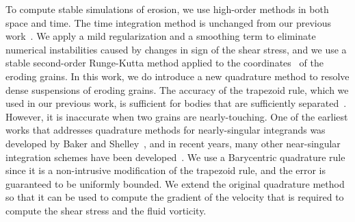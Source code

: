 \documentclass[preprint,10pt]{elsarticle}
\begin{document}
To compute stable simulations of erosion, we use high-order methods in
both space and time. The time integration method is unchanged from our
previous work~\cite{qua-moo2018}.  We apply a mild regularization and a
smoothing term to eliminate numerical instabilities caused by changes in
sign of the shear stress, and we use a stable second-order Runge-Kutta
method applied to the {\thL} coordinates~\cite{hou-low-she1994} of the
eroding grains.  In this work, we do introduce a new quadrature method
to resolve dense suspensions of eroding grains.  The accuracy of the
trapezoid rule, which we used in our previous work, is sufficient for
bodies that are sufficiently separated~\cite{tre-wei2014}. However, it
is inaccurate when two grains are nearly-touching.  One of the earliest
works that addresses quadrature methods for nearly-singular integrands
was developed by Baker and Shelley~\cite{bak-she1986}, and in recent
years, many other near-singular integration schemes have been
developed~\cite{oja-tor2015, kli-tor2018, hel-oja2008a, bea-yin-wil2016,
bea-lai2001, klo-bar-gre-one2013}.  We use a Barycentric quadrature
rule~\cite{bar2014, bar-wu-vee2015} since it is a non-intrusive
modification of the trapezoid rule, and the error is guaranteed to be
uniformly bounded.  We extend the original quadrature method so that it
can be used to compute the gradient of the velocity that is required to
compute the shear stress and the fluid vorticity.
\end{document}
